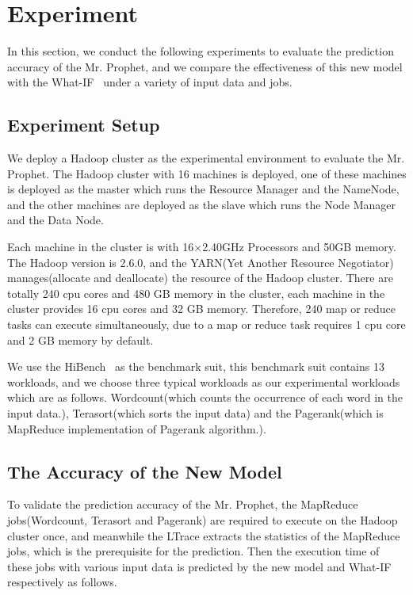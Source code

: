 \section{Experiment}
In this section, we conduct the following experiments to evaluate the prediction accuracy of the Mr. Prophet, and we compare the effectiveness of this new model with the What-IF~\cite{Herodotou2011Profiling} under a variety of input data and jobs.

\subsection{Experiment Setup}
We deploy a Hadoop cluster as the experimental environment to evaluate the Mr. Prophet. The Hadoop cluster with 16 machines is deployed, one of these machines is deployed as the master which runs the Resource Manager and the NameNode, and the other machines are deployed as the slave which runs the Node Manager and the Data Node.

Each machine in the cluster is with 16$\times$2.40GHz Processors and 50GB memory. The Hadoop version is 2.6.0, and the YARN(Yet Another Resource Negotiator)~\cite{Vavilapalli2013Apache} manages(allocate and deallocate) the resource of the Hadoop cluster. There are totally 240 cpu cores and 480 GB memory in the cluster, each machine in the cluster provides 16 cpu cores and 32 GB memory. Therefore, 240 map or reduce tasks can execute simultaneously, due to a map or reduce task requires 1 cpu core and 2 GB memory by default.

We use the HiBench~\cite{Huang2010The} as the benchmark suit, this benchmark suit contains 13 workloads, and we choose three typical workloads as our experimental workloads which are as follows. Wordcount(which counts the occurrence of each word in the input data.), Terasort(which sorts the input data) and the Pagerank(which is MapReduce implementation of Pagerank algorithm.).

\subsection{The Accuracy of the New Model}
To validate the prediction accuracy of the Mr. Prophet, the MapReduce jobs(Wordcount, Terasort and Pagerank) are required to execute on the Hadoop cluster once, and meanwhile the LTrace extracts the statistics of the MapReduce jobs, which is the prerequisite for the prediction. Then the execution time of these jobs with various input data is predicted by the new model and What-IF respectively as follows.


